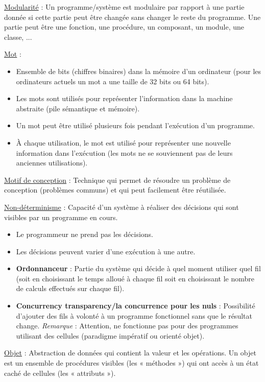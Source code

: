 \documentclass[fr,license=none]{../../../eplsummary}
\begin{document}
\begin{flushleft}
\textcolor{mauvedef}{\underline{Modularité}} : Un programme/système est modulaire par rapport à une partie donnée si cette partie peut être changée sans changer le reste du programme. Une partie peut être une fonction, une procédure, un composant, un module, une classe, ... \bigbreak


\textcolor{mauvedef}{\underline{Mot}} : 
\begin{itemize}
\item Ensemble de bits (chiffres binaires) dans la mémoire d’un ordinateur (pour les ordinateurs actuels un mot a une taille de 32 bits ou 64 bits).
\item Les mots sont utilisés pour représenter l’information dans la machine abstraite (pile sémantique et mémoire).
\item Un mot peut être utilisé plusieurs fois pendant l’exécution d’un programme.
\item À chaque utilisation, le mot est utilisé pour représenter une nouvelle information dans l’exécution (les mots ne se souviennent pas de leurs anciennes utilisations).
\end{itemize}
\bigbreak


\textcolor{mauvedef}{\underline{Motif de conception}} : Technique qui permet de résoudre un problème de conception (problèmes communs) et qui peut facilement être réutilisée.\bigbreak




\textcolor{mauvedef}{\underline{Non-déterminisme}} : Capacité d'un système à réaliser des décisions qui sont visibles par un programme en cours.
\begin{itemize}
\item Le programmeur ne prend pas les décisions.
\item Les décisions peuvent varier d'une exécution à une autre.
\item \textbf{Ordonnanceur} : Partie du système qui décide à quel moment utiliser quel fil (soit en choisissant le temps alloué à chaque fil soit en choisissant le nombre de calculs effectués sur chaque fil).
\item \textbf{Concurrency transparency/la concurrence pour les nuls} : Possibilité d'ajouter des fils à volonté à un programme fonctionnel sans que le résultat change. \textit{Remarque} : Attention, ne fonctionne pas pour des programmes utilisant des cellules (paradigme impératif ou orienté objet).
\end{itemize}
\bigbreak


\textcolor{mauvedef}{\underline{Objet}} : Abstraction de données qui contient la valeur et les opérations. Un objet est un ensemble de procédures visibles (les « méthodes ») qui ont accès à un état caché de cellules (les « attributs »). \bigbreak




\end{flushleft}
\end{document}
